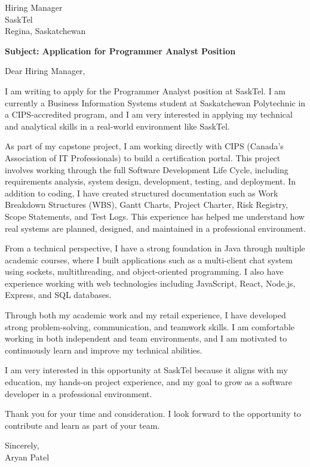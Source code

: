 \documentclass[letterpaper,11pt]{article}
\begin{document}
\vspace{5mm}

\begin{flushleft}
Hiring Manager \\
SaskTel \\
Regina, Saskatchewan \\
\end{flushleft}

\vspace{5mm}

\textbf{Subject: Application for Programmer Analyst Position}

\vspace{5mm}

Dear Hiring Manager,

I am writing to apply for the Programmer Analyst position at SaskTel. I am currently a Business Information Systems student at Saskatchewan Polytechnic in a CIPS-accredited program, and I am very interested in applying my technical and analytical skills in a real-world environment like SaskTel.

As part of my capstone project, I am working directly with CIPS (Canada’s Association of IT Professionals) to build a certification portal. This project involves working through the full Software Development Life Cycle, including requirements analysis, system design, development, testing, and deployment. In addition to coding, I have created structured documentation such as Work Breakdown Structures (WBS), Gantt Charts, Project Charter, Risk Registry, Scope Statements, and Test Logs. This experience has helped me understand how real systems are planned, designed, and maintained in a professional environment.

From a technical perspective, I have a strong foundation in Java through multiple academic courses, where I built applications such as a multi-client chat system using sockets, multithreading, and object-oriented programming. I also have experience working with web technologies including JavaScript, React, Node.js, Express, and SQL databases.

Through both my academic work and my retail experience, I have developed strong problem-solving, communication, and teamwork skills. I am comfortable working in both independent and team environments, and I am motivated to continuously learn and improve my technical abilities.

I am very interested in this opportunity at SaskTel because it aligns with my education, my hands-on project experience, and my goal to grow as a software developer in a professional environment.

Thank you for your time and consideration. I look forward to the opportunity to contribute and learn as part of your team.

\vspace{5mm}

Sincerely, \\
Aryan Patel
\end{document}
